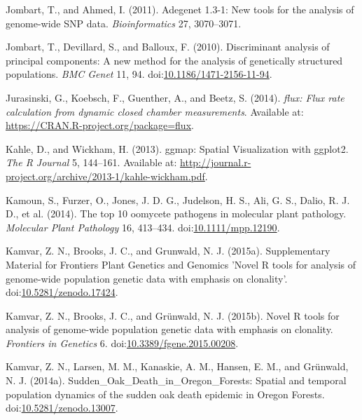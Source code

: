 \documentclass[double,12pt]{beavtex}
\begin{document}
  \hypertarget{ref-jombart2011adegenet}{}
  Jombart, T., and Ahmed, I. (2011). Adegenet 1.3-1: New tools for the
  analysis of genome-wide SNP data. \emph{Bioinformatics} 27, 3070--3071.
  
  \hypertarget{ref-jombart2010discriminant}{}
  Jombart, T., Devillard, S., and Balloux, F. (2010). Discriminant
  analysis of principal components: A new method for the analysis of
  genetically structured populations. \emph{BMC Genet} 11, 94.
  doi:\href{https://doi.org/10.1186/1471-2156-11-94}{10.1186/1471-2156-11-94}.
  
  \hypertarget{ref-jurasinski2014flux}{}
  Jurasinski, G., Koebsch, F., Guenther, A., and Beetz, S. (2014).
  \emph{flux: Flux rate calculation from dynamic closed chamber
  measurements}. Available at:
  \url{https://CRAN.R-project.org/package=flux}.
  
  \hypertarget{ref-khale2013ggmap}{}
  Kahle, D., and Wickham, H. (2013). ggmap: Spatial Visualization with
  ggplot2. \emph{The R Journal} 5, 144--161. Available at:
  \url{http://journal.r-project.org/archive/2013-1/kahle-wickham.pdf}.
  
  \hypertarget{ref-kamoun2014top}{}
  Kamoun, S., Furzer, O., Jones, J. D. G., Judelson, H. S., Ali, G. S.,
  Dalio, R. J. D., et al. (2014). The top 10 oomycete pathogens in
  molecular plant pathology. \emph{Molecular Plant Pathology} 16,
  413--434.
  doi:\href{https://doi.org/10.1111/mpp.12190}{10.1111/mpp.12190}.
  
  \hypertarget{ref-kamvar2015poppr2supp}{}
  Kamvar, Z. N., Brooks, J. C., and Grunwald, N. J. (2015a). Supplementary
  Material for Frontiers Plant Genetics and Genomics 'Novel R tools for
  analysis of genome-wide population genetic data with emphasis on
  clonality'.
  doi:\href{https://doi.org/10.5281/zenodo.17424}{10.5281/zenodo.17424}.
  
  \hypertarget{ref-kamvar2015novel}{}
  Kamvar, Z. N., Brooks, J. C., and Grünwald, N. J. (2015b). Novel R tools
  for analysis of genome-wide population genetic data with emphasis on
  clonality. \emph{Frontiers in Genetics} 6.
  doi:\href{https://doi.org/10.3389/fgene.2015.00208}{10.3389/fgene.2015.00208}.
  
  \hypertarget{ref-kamvar2014sudden}{}
  Kamvar, Z. N., Larsen, M. M., Kanaskie, A. M., Hansen, E. M., and
  Grünwald, N. J. (2014a). Sudden\_Oak\_Death\_in\_Oregon\_Forests:
  Spatial and temporal population dynamics of the sudden oak death
  epidemic in Oregon Forests.
  doi:\href{https://doi.org/10.5281/zenodo.13007}{10.5281/zenodo.13007}.
  
\end{document}
